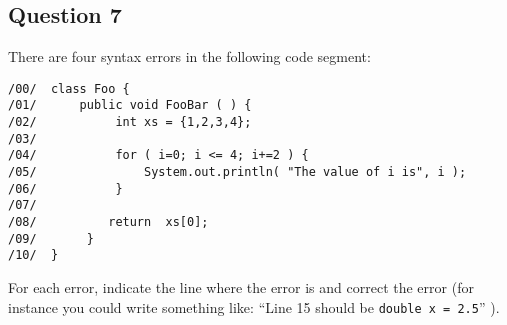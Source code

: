 \AnsBox{9.2cm}


\subsection*{Question 7}
There are four syntax errors in the following code segment:
\begin{verbatim}
/00/  class Foo {
/01/      public void FooBar ( ) {
/02/           int xs = {1,2,3,4};
/03/
/04/           for ( i=0; i <= 4; i+=2 ) {
/05/               System.out.println( "The value of i is", i );
/06/           }
/07/
/08/          return  xs[0];
/09/       }
/10/  }
\end{verbatim}
For each error, indicate the line where the error is and correct the error (for instance you could write something like: ``Line 15 should be \texttt{double x = 2.5}'' ). \\

\AnsBox{12cm}